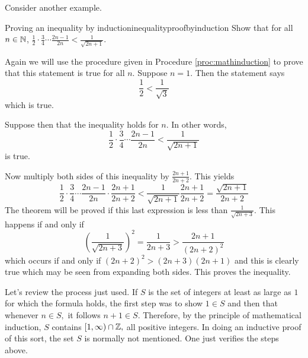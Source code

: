 Consider another example.

\begin{example}{Proving an inequality by induction}{inequalityproofbyinduction}
Show that for all $n\in \mathbb{N}$, $\displaystyle \frac{1}{2}\cdot 
\displaystyle \frac{3}{4}\cdots \displaystyle \frac{2n-1}{2n}<\displaystyle
\frac{1}{\sqrt{2n+1}}.$
\end{example}

\begin{solution}
Again we will use the procedure given in Procedure \ref{proc:mathinduction} to prove that this statement is true for all $n$.
Suppose $n=1$. Then the statement says 
\begin{equation*}
\frac{1}{2}< \frac{1}{\sqrt{3}}
\end{equation*}
 which is true. 

Suppose then that
the inequality holds for $n.$ In other words, 
\begin{equation*}
 \frac{1}{2}\cdot \frac{3}{4}\cdots \frac{2n-1}{2n} < \frac{1}{\sqrt{2n+1}}
\end{equation*}
is true.

Now multiply both sides of this inequality by $\frac{2n+1}{2n+2}$.
This yields
\begin{equation*}
\frac{1}{2}\cdot \frac{3}{4}\cdots \frac{2n-1}{2n}\cdot \frac{2n+1}{2n+2}<
\frac{1}{\sqrt{2n+1}}\frac{2n+1}{2n+2}=\frac{\sqrt{2n+1}}{2n+2}
\end{equation*}
The theorem will be proved if this last expression is less than $
\displaystyle\frac{1}{\sqrt{2n+3}}.$ This happens if and only if
\begin{equation*}
\left( \frac{1}{\sqrt{2n+3}}\right) ^{2}=\frac{1}{2n+3}>\frac{2n+1}{\left(
2n+2\right) ^{2}}
\end{equation*}
which occurs if and only if $\left( 2n+2\right) ^{2}>\left( 2n+3\right)
\left( 2n+1\right) $ and this is clearly true which may be seen from
expanding both sides. This proves the inequality.
\end{solution}

Let's review the process just used. If $S$ is the set of integers at least as
large as $1$ for which the formula holds, the first step was to show $1\in S$
and then that whenever $n\in S,$ it follows $n+1\in S.$ Therefore, by the
principle of mathematical induction, $S$ contains $[1,\infty )\cap \mathbb{Z}
,$ all positive integers. In doing an inductive proof of this sort, the set $
S$ is normally not mentioned. One just verifies the steps above. 
